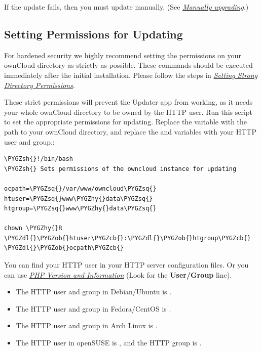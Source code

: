 \documentclass[letterpaper,10pt,english]{sphinxmanual}
\def\PYGZob{\char`\{}
\def\PYGZcb{\char`\}}
\def\PYGZsh{\char`\#}
\def\PYGZdl{\char`\$}
\def\PYGZhy{\char`\-}
\def\PYGZsq{\char`\'}
\begin{document}
If the update fails, then you must update manually. (See {\hyperref[maintenance/manual_upgrade::doc]{\emph{Manually
upgrading}}}.)


\subsection{Setting Permissions for Updating}
\label{maintenance/update:setting-permissions-for-updating}\label{maintenance/update:set-updating-permissions-label}
For hardened security we  highly recommend setting the permissions on your
ownCloud directory as strictly as possible. These commands should be executed
immediately after the initial installation. Please follow the steps in
{\hyperref[installation/installation_wizard:strong-perms-label]{\emph{Setting Strong Directory Permissions}}}.

These strict permissions will prevent the Updater app from working, as it needs
your whole ownCloud directory to be owned by the HTTP user. Run this script to
set the appropriate permissions for updating. Replace the  variable
with the path to your ownCloud directory, and replace the  and
 variables with your HTTP user and group.:

\begin{Verbatim}[commandchars=\\\{\}]
\PYGZsh{}!/bin/bash
\PYGZsh{} Sets permissions of the owncloud instance for updating

ocpath=\PYGZsq{}/var/www/owncloud\PYGZsq{}
htuser=\PYGZsq{}www\PYGZhy{}data\PYGZsq{}
htgroup=\PYGZsq{}www\PYGZhy{}data\PYGZsq{}

chown \PYGZhy{}R \PYGZdl{}\PYGZob{}htuser\PYGZcb{}:\PYGZdl{}\PYGZob{}htgroup\PYGZcb{} \PYGZdl{}\PYGZob{}ocpath\PYGZcb{}
\end{Verbatim}

You can find your HTTP user in your HTTP server configuration files. Or you can
use {\hyperref[issues/general_troubleshooting:label-phpinfo]{\emph{PHP Version and Information}}} (Look for the \textbf{User/Group} line).
\begin{itemize}
\item {} 
The HTTP user and group in Debian/Ubuntu is .

\item {} 
The HTTP user and group in Fedora/CentOS is .

\item {} 
The HTTP user and group in Arch Linux is .

\item {} 
The HTTP user in openSUSE is , and the HTTP group is .

\end{itemize}
\end{document}
